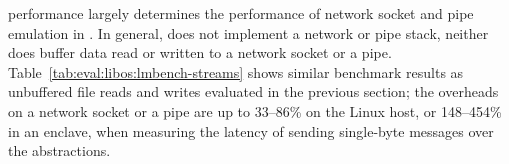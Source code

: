 \label{sec:eval:libos:streams}


\begin{table}[t!b!]

\caption{Network socket and pipe performance based on \lmbench{}. The comparison is among (1) native Linux processes; (2) \graphene{} on Linux host, both without and with \seccomp{} filter ({\bf +SC}) and reference monitor ({\bf +RM}); (3) \graphenesgx{}.
System call latency is in microseconds, and lower is better.
System call bandwidth is in megabytes per second, and higher is better. 
Overheads are relative to Linux; negative overheads indicate improvement.} 
\label{tab:eval:libos:lmbench-streams}
\end{table}


\Thehostabi{} performance
largely determines
the performance of network socket and pipe emulation
in \thelibos{}.
In general, \thelibos{} does not implement a network or pipe stack,
neither does \thelibos{}
buffer data read or written to a network socket or a pipe.
Table~\ref{tab:eval:libos:lmbench-streams} shows similar benchmark results as
unbuffered file reads and writes evaluated in the previous section;
the overheads on a network socket or a pipe are up to 33--86\% on the Linux host,
or 148--454\% in an \sgx{} enclave,
when measuring the latency of sending single-byte messages
over the abstractions.
 
